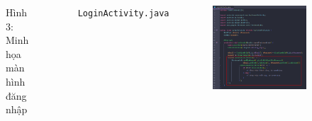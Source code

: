 \documentclass{beamer}
\begin{document}
\begin{frame}
\begin{columns}
\begin{figure}
            \caption{\centering\tiny{Hình 3: Minh họa màn hình đăng nhập}}
        \end{figure}
        \indent \texttt{LoginActivity.java}
        \begin{figure}
            \centering
            \includegraphics[width=\textwidth]{images/29.png}
        \end{figure}
    \end{columns}
\end{frame}
\end{document}
